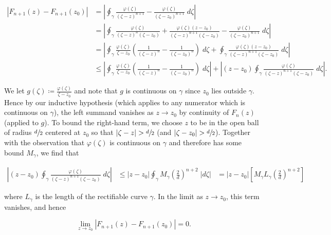 \begin{solution}
    \begin{align*}
        \left|F_{n+1}(z) - F_{n+1}(z_0)\right| 
          &= \left|\oint_{\gamma} {\frac{\varphi(\zeta)}{(\zeta - z)^{n+1}} - \frac{\varphi(\zeta)}{(\zeta - z_0)^{n+1}} \; d\zeta} \right| \\
          &= \left|\oint_{\gamma} {\frac{\varphi(\zeta)}{(\zeta - z)^{n}(\zeta - z_0)} + \frac{\varphi(\zeta)(z - z_0)}{(\zeta - z)^{n+1}(\zeta - z_0)} - \frac{\varphi(\zeta)}{(\zeta - z_0)^{n+1}} \; d\zeta} \right| \\
          &= \left|\oint_{\gamma} {\frac{\varphi(\zeta)}{\zeta - z_0}\left(\frac{1}{(\zeta - z)^{n}} - \frac{1}{(\zeta - z_0)^{n}} \right) \; d\zeta} + \oint_{\gamma} {\frac{\varphi(\zeta)(z - z_0)}{(\zeta - z)^{n+1}(\zeta - z_0)} \; d\zeta} \right| \\
          &\le \left|\oint_{\gamma} {\frac{\varphi(\zeta)}{\zeta - z_0}\left(\frac{1}{(\zeta - z)^{n}} - \frac{1}{(\zeta - z_0)^{n}} \right) \; d\zeta} \right| + \left|(z - z_0) \oint_{\gamma} {\frac{\varphi(\zeta)}{(\zeta - z)^{n+1}(\zeta - z_0)} \; d\zeta} \right|.
    \end{align*}

    We let $g(\zeta) \coloneqq \frac{\varphi(\zeta)}{\zeta - z_0}$ and note that $g$ is continuous on $\gamma$ since
    $z_0$ lies outside $\gamma$. Hence by our inductive hypothesis (which applies to any numerator which is continuous 
    on $\gamma$), the left summand vanishes as $z \to z_0$ by continuity of $F_n(z)$ (applied to $g$). To bound the 
    right-hand term, we choose $z$ to be in the open ball of radius $\sfrac{d}{2}$ centered at $z_0$ so that 
    $|\zeta - z| > \sfrac{d}{2}$ (and $|\zeta - z_0| > \sfrac{d}{2}$). Together with the observation that 
    $\varphi(\zeta)$ is continuous on $\gamma$ and therefore has some bound $M_{\gamma}$, we find that

    \begin{align*}
        \left|(z - z_0) \oint_{\gamma} {\frac{\varphi(\zeta)}{(\zeta - z)^{n+1}(\zeta - z_0)} \; d\zeta} \right| 
          &\le |z - z_0| \oint_{\gamma} { M_{\gamma} \left(\frac{2}{d}\right)^{n+2} \; |d\zeta| }
          &= |z - z_0| \left[ M_{\gamma} L_{\gamma} \left(\frac{2}{d}\right)^{n+2} \right]
    \end{align*}

    where $L_{\gamma}$ is the length of the rectifiable curve $\gamma$. In the limit as $z \to z_0$, this
    term vanishes, and hence

    $$
    \lim_{z \to z_0} \left|F_{n+1}(z) - F_{n+1}(z_0)\right| = 0.
    $$


\end{solution}
